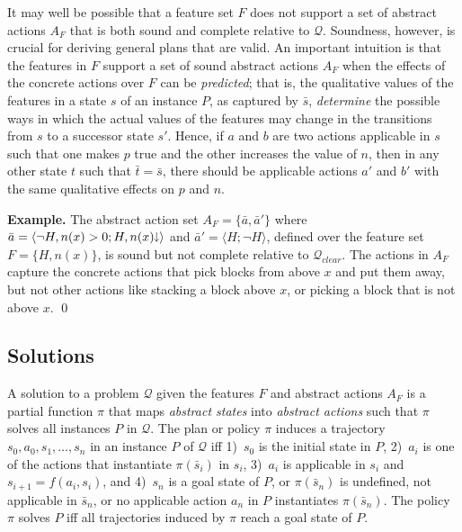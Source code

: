 \documentclass[letterpaper]{article} %
\newcommand{\tup}[1]{\langle #1 \rangle}
\newenvironment{example}{\noindent\textbf{Example.}\xspace}{\qed}
\newcommand{\Q}{\mathcal{Q}}
\newcommand{\abst}[2]{\tup{#1;#2}}
\newcommand{\mminus}{\hspace{-.05em}\raisebox{.15ex}{\footnotesize$\downarrow$}}
\begin{document}
It may well be possible  that a  feature set $F$ does not  support a set of abstract actions $A_F$
that is both sound and complete relative to $\Q$. Soundness, however, is  crucial for deriving general plans that are valid.
An important intuition is that the features in $F$ support a set of sound abstract actions $A_F$ when the
effects of the concrete actions over $F$ can be \emph{predicted};
that is, the qualitative values of the features in a state $s$ of an instance $P$,
as captured by $\bar{s}$, \emph{determine} the possible ways in which the actual
values of the features may change in the transitions from $s$ to a successor state $s'$.
Hence, if $a$ and $b$ are two actions applicable in $s$ such that one makes
$p$ true and the other increases the value of $n$, then in any other state $t$
such that $\bar{t}=\bar{s}$, there should be applicable actions $a'$ and $b'$
with the same qualitative effects on $p$ and $n$.


\medskip
\begin{example}
  The abstract action set $A_F = \{\bar{a}, \bar{a}'\}$ where $\bar{a} = \abst{\neg H,n(x)>0}{H,n(x)\mminus}$
  and $\bar{a}'=\abst{H}{\neg H}$, defined over the feature set $F=\{H,n(x)\}$,
  is sound but not complete relative to $\Q_{clear}$.
  The actions in $A_F$ capture the concrete actions that pick blocks from above $x$ and put them away,
  but not other actions like stacking a block above $x$, or picking a block that is not above $x$.
\end{example}


\subsection{Solutions}

A solution to a problem $\Q$ given the features $F$ and abstract
actions $A_F$ is a partial function $\pi$ that maps \emph{abstract states}
into \emph{abstract actions} such that $\pi$ solves all instances $P$ in $\Q$.
The plan or policy $\pi$ induces a trajectory $s_0,a_0,s_1, \ldots, s_n$ in
an instance $P$ of $\Q$ iff
1)~$s_0$ is the initial state in $P$,
2)~$a_i$ is one of the actions that instantiate $\pi(\bar{s}_i)$ in $s_i$,
3)~$a_i$ is applicable in $s_i$ and $s_{i+1}=f(a_i,s_i)$, and
4)~$s_n$ is a goal state of $P$, or $\pi(\bar{s}_n)$ is undefined,
not applicable in $\bar s_n$, or no applicable action $a_n$ in $P$ instantiates $\pi(\bar{s}_n)$.
The policy $\pi$ solves $P$ iff all trajectories induced by $\pi$ reach a goal state of $P$.
\end{document}
